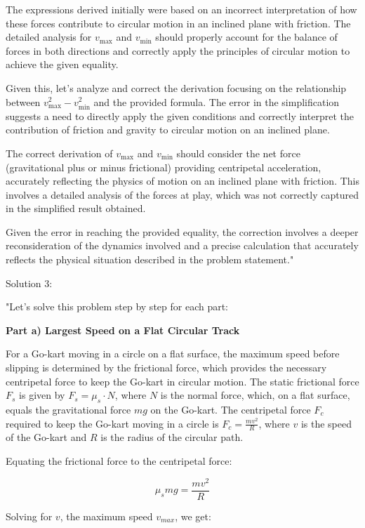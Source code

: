 The expressions derived initially were based on an incorrect interpretation of how these forces contribute to circular motion in an inclined plane with friction. The detailed analysis for \( v_{\text{max}} \) and \( v_{\text{min}} \) should properly account for the balance of forces in both directions and correctly apply the principles of circular motion to achieve the given equality.

Given this, let's analyze and correct the derivation focusing on the relationship between \( v_{\text{max}}^2 - v_{\text{min}}^2 \) and the provided formula. The error in the simplification suggests a need to directly apply the given conditions and correctly interpret the contribution of friction and gravity to circular motion on an inclined plane. 

The correct derivation of \( v_{\text{max}} \) and \( v_{\text{min}} \) should consider the net force (gravitational plus or minus frictional) providing centripetal acceleration, accurately reflecting the physics of motion on an inclined plane with friction. This involves a detailed analysis of the forces at play, which was not correctly captured in the simplified result obtained. 

Given the error in reaching the provided equality, the correction involves a deeper reconsideration of the dynamics involved and a precise calculation that accurately reflects the physical situation described in the problem statement."

Solution 3:

"Let's solve this problem step by step for each part:

\textbf{Part a) Largest Speed on a Flat Circular Track}

For a Go-kart moving in a circle on a flat surface, the maximum speed before slipping is determined by the frictional force, which provides the necessary centripetal force to keep the Go-kart in circular motion. The static frictional force \(F_{s}\) is given by \(F_{s} = \mu_{s} \cdot N\), where \(N\) is the normal force, which, on a flat surface, equals the gravitational force \(mg\) on the Go-kart. The centripetal force \(F_{c}\) required to keep the Go-kart moving in a circle is \(F_{c} = \frac{m v^2}{R}\), where \(v\) is the speed of the Go-kart and \(R\) is the radius of the circular path.

Equating the frictional force to the centripetal force:

\[
\mu_{s} mg = \frac{m v^2}{R}
\]

Solving for \(v\), the maximum speed \(v_{max}\), we get:

